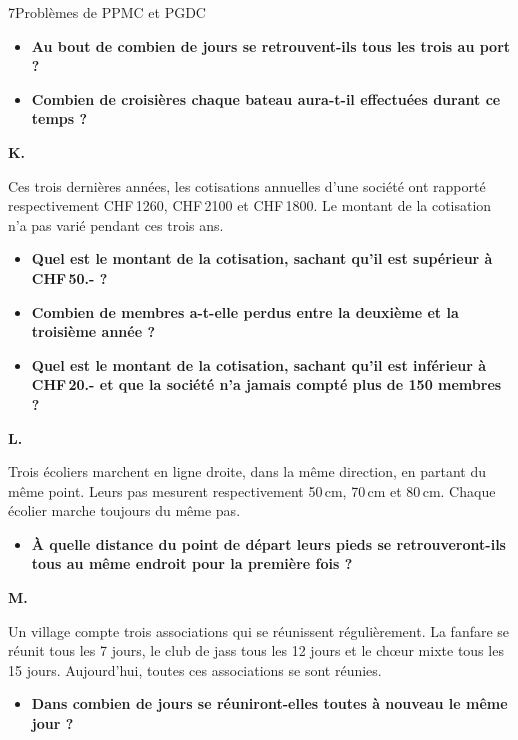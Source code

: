 \begin{exercice}{7}{Problèmes de PPMC et PGDC}
\begin{itemize}[label=$\blacktriangleright$]
\item \textbf{Au bout de combien de jours se retrouvent-ils tous les trois au port ?}
\item \textbf{Combien de croisières chaque bateau aura-t-il effectuées durant ce temps ?}
\end{itemize}

\bigskip\textbf{K.}

\medskip
Ces trois dernières années, les cotisations annuelles d'une société ont rapporté respectivement CHF\,1260, CHF\,2100 et CHF\,1800.
Le montant de la cotisation n'a pas varié pendant ces trois ans.

\begin{itemize}[label=$\blacktriangleright$]
\item \textbf{Quel est le montant de la cotisation, sachant qu'il est supérieur à CHF\,50.- ?}
\item \textbf{Combien de membres a-t-elle perdus entre la deuxième et la troisième année ?}
\item \textbf{Quel est le montant de la cotisation, sachant qu'il est inférieur à CHF\,20.- et que la société n'a jamais compté plus de 150 membres ?}
\end{itemize}

\bigskip\textbf{L.}

\medskip
Trois écoliers marchent en ligne droite, dans la même direction, en partant du même point. Leurs pas mesurent respectivement 50\,cm, 70\,cm et 80\,cm. Chaque écolier marche toujours du même pas.

\begin{itemize}[label=$\blacktriangleright$]
\item \textbf{À quelle distance du point de départ leurs pieds se retrouveront-ils tous au même endroit pour la première fois ?}
\end{itemize}

\bigskip\textbf{M.}

\medskip
Un village compte trois associations qui se réunissent régulièrement. La fanfare se réunit tous les 7 jours, le club de jass tous les 12 jours et le chœur mixte tous les 15 jours. Aujourd'hui, toutes ces associations se sont réunies.

\begin{itemize}[label=$\blacktriangleright$]
\item \textbf{Dans combien de jours se réuniront-elles toutes à nouveau le même jour ?}
\end{itemize}


\end{exercice}
